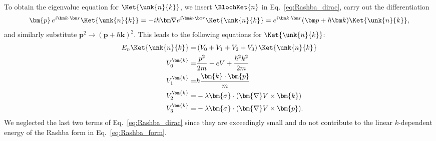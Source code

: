 To obtain the eigenvalue equation for $\Ket{\unk{n}{k}}$, we insert $\BlochKet{n}$ in Eq.~\eqref{eq:Rashba_dirac}, carry out the differentiation
\begin{equation}
	\label{eq:Rashba_momentum}
\bm{p} \, \Eikr\Ket{\unk{n}{k}} = -i \hbar \bm \nabla \Eikr\Ket{\unk{n}{k}} = \Eikr(\bm p + \hbar \bm k)\Ket{\unk{n}{k}},
\end{equation}
and similarly substitute $\bm{p}^2 \rightarrow (\bm{p}+\hbar \bm{k})^2$.
This leads to the following equations for $\Ket{\unk{n}{k}}$:
\begin{align}
	\label{eq:Rashba_unk_Vs}
	E_n \Ket{\unk{n}{k}} =& \left(V_0 + V_1  +  V_2 + V_3 \right) \Ket{\unk{n}{k}} \\
	V_0^{\bm{k}} =& \frac{p^2}{2m} - eV + \frac{\hbar^2 k^2}{2m} \\
	V_1^{\bm{k}} =& \hbar\frac{\bm{k}\cdot\bm{p}}{m} \\
	V_2^{\bm{k}} =& -\lambda \bm{\sigma} \cdot ( \bm{\nabla}V \times \bm{k}) \\
	V_3^{\bm{k}} =& -\lambda \bm{\sigma} \cdot ( \bm{\nabla}V \times \bm{p}).
\end{align}
We neglected the last two terms of Eq.~\eqref{eq:Rashba_dirac} since they are exceedingly small and do not contribute to the linear $k$-dependent energy of the Rashba form in Eq.~\eqref{eq:Rashba_form}.

